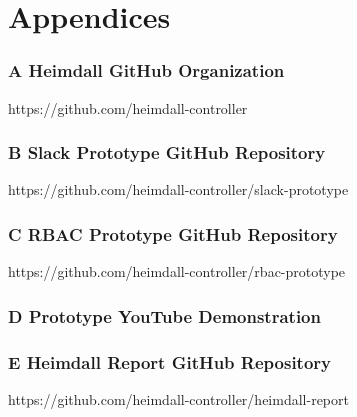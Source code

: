 \documentclass{article}
\begin{document}
\clearpage
\section*{Appendices}
\subsubsection*{A Heimdall GitHub Organization} \label{appendix-a}
\hypertarget{appendix-a}{https://github.com/heimdall-controller}

\subsubsection*{B Slack Prototype GitHub Repository} 
\hypertarget{appendix-b}{https://github.com/heimdall-controller/slack-prototype}

\subsubsection*{C RBAC Prototype GitHub Repository} 
\hypertarget{appendix-c}{https://github.com/heimdall-controller/rbac-prototype}

\subsubsection*{D Prototype YouTube Demonstration} \label{appendix-d}
\hypertarget{appendix-d}{}

\subsubsection*{E Heimdall Report GitHub Repository} \label{appendix-e}
\hypertarget{appendix-e}{https://github.com/heimdall-controller/heimdall-report}
\end{document}
